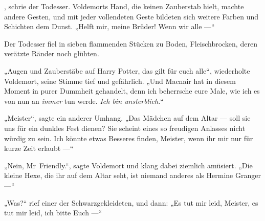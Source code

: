 , schrie der Todesser.
Voldemorts Hand, die keinen Zauberstab hielt, machte andere Gesten, und mit jeder vollendeten Geste bildeten sich weitere Farben und Schichten dem Dunst.
„Helft mir, meine Brüder! Wenn wir alle —“

Der Todesser fiel in sieben flammenden Stücken zu Boden, Fleischbrocken, deren verätzte Ränder noch glühten.

„Augen und Zauberstäbe auf Harry Potter, das gilt für euch alle“, wiederholte Voldemort, seine Stimme tief und gefährlich.
„Und Macnair hat in diesem Moment in purer Dummheit gehandelt, denn ich beherrsche eure Male, wie ich es von nun an \emph{immer} tun werde. \emph{Ich bin unsterblich.}“

„Meister“, sagte ein anderer Umhang.
„Das Mädchen auf dem Altar — soll sie uns für ein dunkles Fest dienen? Sie scheint eines so freudigen Anlasses nicht würdig zu sein. Ich könnte etwas Besseres finden, Meister, wenn ihr mir nur für kurze Zeit erlaubt —“

„Nein, Mr~Friendly.“, sagte Voldemort und klang dabei ziemlich amüsiert.
„Die kleine Hexe, die ihr auf dem Altar seht, ist niemand anderes als Hermine Granger —“

„Was?“ rief einer der Schwarzgekleideten, und dann:
„Es tut mir leid, Meister, es tut mir leid, ich bitte Euch —“

